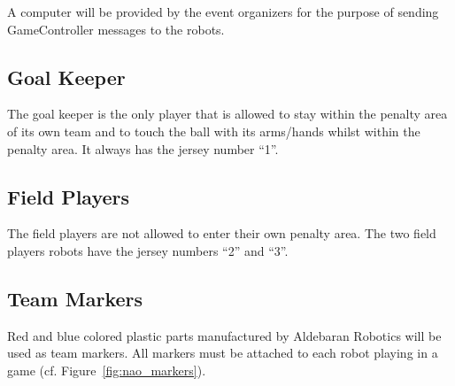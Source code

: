 \documentclass[12pt]{article}
\newcommand{\cf}{\mbox{cf.}\xspace}
\begin{document}
A computer will be provided by the event organizers for the purpose
of sending GameController messages to the robots.


\subsection{Goal Keeper}
\label{sec:goal_keeper}

The goal keeper is the only player that is allowed to stay within
the penalty area of its own team and to touch the ball with its arms/hands whilst within the penalty area. It always has the jersey number
``1''.

\subsection{Field Players}
\label{sec:field_players}

The field players are not allowed to enter their own penalty area.
The two field players robots have the jersey numbers ``2'' and ``3''.

\subsection{Team Markers}

Red and blue colored plastic parts manufactured by Aldebaran Robotics will be used as team markers. All markers
must be attached to each robot playing in a game (\cf Figure~\ref{fig:nao_markers}).
\end{document}
